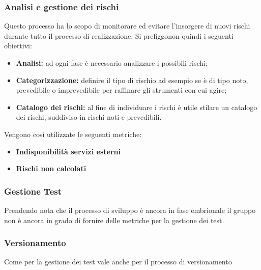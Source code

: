 \subsubsection{Analisi e gestione dei rischi}
Questo processo ha lo scopo di monitorare ed evitare l'insorgere di nuovi rischi durante tutto il processo di realizzazione. Si prefiggonon quindi i seguenti obiettivi:
\begin{itemize}
	\item{\textbf{Analisi:} ad ogni fase è necessario analizzare i possibili rischi;}
	\item{\textbf{Categorizzazione:}  definire il tipo di rischio ad esempio se è di tipo noto, prevedibile o imprevedibile per raffinare gli strumenti con cui agire;}
	\item{\textbf{Catalogo dei rischi:} al fine di individuare i rischi è utile stilare un catalogo dei rischi, suddiviso in rischi noti e prevedibili.}
\end{itemize}
Vengono così utilizzate le seguenti metriche: 
\begin{itemize}
	\item{\textbf{Indisponibilità servizi esterni}}
	\item{\textbf{Rischi non calcolati}}
\end{itemize}
\begin{table}[!h]
\end{table}
\newpage
\subsubsection{Gestione Test}
Prendendo nota che il processo di sviluppo è ancora in fase embrionale il gruppo non è ancora in grado di fornire delle metriche per la gestione dei test.
\subsubsection{Versionamento}
Come per la gestione dei test vale anche per il processo di versionamento